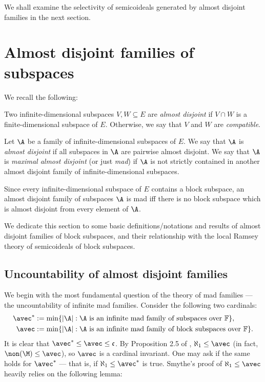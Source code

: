 \documentclass[11pt,reqno]{amsart}
\begin{document}
We shall examine the selectivity of semicoideals generated by almost disjoint families in the next section.

\section{Almost disjoint families of subspaces}
\label{sec:ad.families}
We recall the following:
\begin{definition}
    Two infinite-dimensional subspaces $V,W \subseteq E$ are \emph{almost disjoint} if $V \cap W$ is a finite-dimensional subspace of $E$. Otherwise, we say that $V$ and $W$ are \emph{compatible}.
\end{definition}

\begin{definition}    
    Let $\A$ be a family of infinite-dimensional subspaces of $E$. We say that $\A$ is \emph{almost disjoint} if all subspaces in $\A$ are pairwise almost disjoint. We say that $\A$ is \emph{maximal almost disjoint} (or just \emph{mad}) if $\A$ is not strictly contained in another almost disjoint family of infinite-dimensional subspaces.
\end{definition}

Since every infinite-dimensional subspace of $E$ contains a block subspace, an almost disjoint family of subspaces $\A$ is mad iff there is no block subspace which is almost disjoint from every element of $\A$.

We dedicate this section to some basic definitions/notations and results of almost disjoint families of block subspaces, and their relationship with the local Ramsey theory of semicoideals of block subspaces.

\subsection{Uncountability of almost disjoint families}
We begin with the most fundamental question of the theory of mad families --- the uncountability of infinite mad families. Consider the following two cardinals:
\begin{align*}
    \avec^* &:= \min\{|\A| : \text{$\A$ is an infinite mad family of subspaces over $\mathbb{F}$}\}, \\
    \avec &:= \min\{|\A| : \text{$\A$ is an infinite mad family of block subspaces over $\mathbb{F}$}\}.
\end{align*}
It is clear that $\avec^* \leq \avec \leq \frak{c}$. By Proposition 2.5 of \cite{S19}, $\aleph_1 \leq \avec$ (in fact, $\non(\M) \leq \avec$), so $\avec$ is a cardinal invariant. One may ask if the same holds for $\avec^*$ --- that is, if $\aleph_1 \leq \avec^*$ is true. Smythe's proof of $\aleph_1 \leq \avec$ heavily relies on the following lemma:
\end{document}

